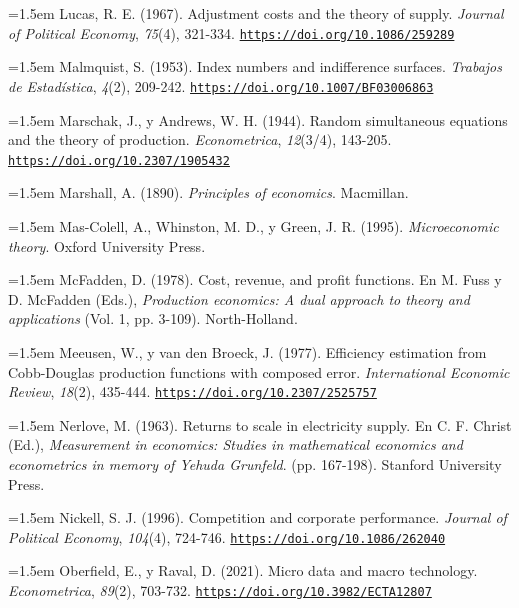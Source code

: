 \documentclass[10pt,a4paper]{article}
\begin{document}
\noindent\hangindent=1.5em Lucas, R. E. (1967). Adjustment costs and the theory of supply. \textit{Journal of Political Economy}, \textit{75}(4), 321-334. \href{https://doi.org/10.1086/259289}{\nolinkurl{https://doi.org/10.1086/259289}}

\noindent\hangindent=1.5em Malmquist, S. (1953). Index numbers and indifference surfaces. \textit{Trabajos de Estadística}, \textit{4}(2), 209-242. \href{https://doi.org/10.1007/BF03006863}{\nolinkurl{https://doi.org/10.1007/BF03006863}}

\noindent\hangindent=1.5em Marschak, J., y Andrews, W. H. (1944). Random simultaneous equations and the theory of production. \textit{Econometrica}, \textit{12}(3/4), 143-205. \href{https://doi.org/10.2307/1905432}{\nolinkurl{https://doi.org/10.2307/1905432}}

\noindent\hangindent=1.5em Marshall, A. (1890). \textit{Principles of economics}. Macmillan.

\noindent\hangindent=1.5em Mas-Colell, A., Whinston, M. D., y Green, J. R. (1995). \textit{Microeconomic theory}. Oxford University Press.

\noindent\hangindent=1.5em McFadden, D. (1978). Cost, revenue, and profit functions. En M. Fuss y D. McFadden (Eds.), \textit{Production economics: A dual approach to theory and applications} (Vol. 1, pp. 3-109). North-Holland.

\noindent\hangindent=1.5em Meeusen, W., y van den Broeck, J. (1977). Efficiency estimation from Cobb-Douglas production functions with composed error. \textit{International Economic Review}, \textit{18}(2), 435-444. \href{https://doi.org/10.2307/2525757}{\nolinkurl{https://doi.org/10.2307/2525757}}

\noindent\hangindent=1.5em Nerlove, M. (1963). Returns to scale in electricity supply. En C. F. Christ (Ed.), \textit{Measurement in economics: Studies in mathematical economics and econometrics in memory of Yehuda Grunfeld}. (pp. 167-198). Stanford University Press.

\noindent\hangindent=1.5em Nickell, S. J. (1996). Competition and corporate performance. \textit{Journal of Political Economy}, \textit{104}(4), 724-746. \href{https://doi.org/10.1086/262040}{\nolinkurl{https://doi.org/10.1086/262040}}

\noindent\hangindent=1.5em Oberfield, E., y Raval, D. (2021). Micro data and macro technology. \textit{Econometrica}, \textit{89}(2), 703-732. \href{https://doi.org/10.3982/ECTA12807}{\nolinkurl{https://doi.org/10.3982/ECTA12807}}
\end{document}
